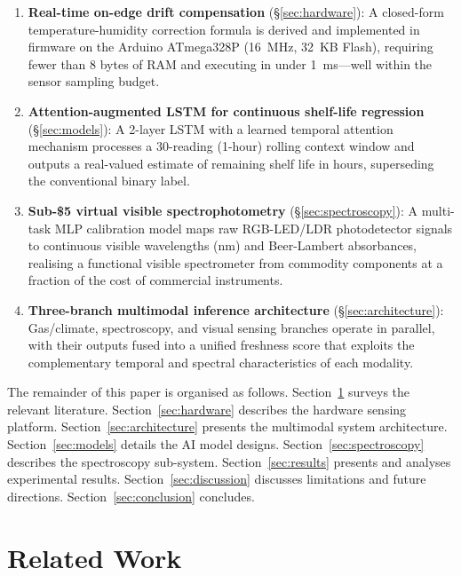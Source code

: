 \documentclass{ieeeaccess}
\begin{document}
\begin{enumerate}
  \item \textbf{Real-time on-edge drift compensation} (\S\ref{sec:hardware}): A closed-form temperature-humidity correction formula is derived and implemented in firmware on the Arduino ATmega328P (16~MHz, 32~KB Flash), requiring fewer than 8 bytes of RAM and executing in under 1~ms---well within the sensor sampling budget.

  \item \textbf{Attention-augmented LSTM for continuous shelf-life regression} (\S\ref{sec:models}): A 2-layer LSTM with a learned temporal attention mechanism processes a 30-reading (1-hour) rolling context window and outputs a real-valued estimate of remaining shelf life in hours, superseding the conventional binary label.

  \item \textbf{Sub-\$5 virtual visible spectrophotometry} (\S\ref{sec:spectroscopy}): A multi-task MLP calibration model maps raw RGB-LED/LDR photodetector signals to continuous visible wavelengths (nm) and Beer-Lambert absorbances, realising a functional visible spectrometer from commodity components at a fraction of the cost of commercial instruments.

  \item \textbf{Three-branch multimodal inference architecture} (\S\ref{sec:architecture}): Gas/climate, spectroscopy, and visual sensing branches operate in parallel, with their outputs fused into a unified freshness score that exploits the complementary temporal and spectral characteristics of each modality.
\end{enumerate}

The remainder of this paper is organised as follows. Section~\ref{sec:related} surveys the relevant literature. Section~\ref{sec:hardware} describes the hardware sensing platform. Section~\ref{sec:architecture} presents the multimodal system architecture. Section~\ref{sec:models} details the AI model designs. Section~\ref{sec:spectroscopy} describes the spectroscopy sub-system. Section~\ref{sec:results} presents and analyses experimental results. Section~\ref{sec:discussion} discusses limitations and future directions. Section~\ref{sec:conclusion} concludes.

\section{Related Work}
\label{sec:related}
\end{document}
